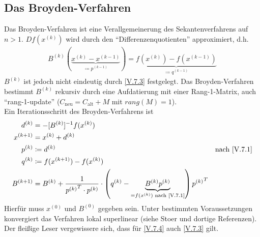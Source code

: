 \documentclass[ngerman,fontsize=11pt, paper=a4, parskip=half, titlepage=true, toc=bib]{scrbook}
\begin{document}
  
  
  \subsection{Das Broyden-Verfahren}
  Das Broyden-Verfahren ist eine Verallgemeinerung des Sekantenverfahrens
  auf $n>1$. $Df(x^{(k)})$ wird durch den
  \enquote{Differenzenquotienten} approximiert, d.h.
  \begin{gather}
    B^{(k)}(\underbrace{x^{(k)}-x^{(k-1)}}_{\coloneqq p^{(k-1)}})
    = \underbrace{f(x^{(k)})-f(x^{(k-1)})}_{\coloneqq
      q^{(k-1)}}
    \label{V.7.3}
  \end{gather}
  $B^{(k)}$ ist jedoch nicht eindeutig durch \eqref{V.7.3} festgelegt.
  Das Broyden-Verfahren bestimmt $B^{(k)}$ rekursiv durch eine 
  Aufdatierung mit einer Rang-1-Matrix, auch \enquote{rang-1-update}
  ($C_\text{neu} = C_\text{alt} +M$ mit $rang(M)=1$). \\

  Ein Iterationsschritt des Broyden-Verfahrens ist 
  \begin{align}\nonumber
    d^{(k)} &= -[B^{(k)}]^{-1} f(x^{(k)}) \\\nonumber
    x^{(k+1)} &= x^{(k)} + d^{(k)} \\\nonumber
    p^{(k)} & \coloneqq d^{(k)} &\text{nach
                                  \eqref{V.7.1}}\\\nonumber
    q^{(k)} & \coloneqq f(x^{(k+1)})-f(x^{(k)}) \\
    B^{(k+1)} & = B^{(k)} + \frac{1}{{p^{(k)}}^T\cdot p^{(k)}}
                \cdot \left(q^{(k)}-
                \underbrace{B^{(k)}p^{(k)}}_{=f(x^{(k)})
                \text{ nach \eqref{V.7.1}}}
                \right){p^{(k)}}^T
                \label{V.7.4}
  \end{align}
  Hierfür muss $x^{(0)} $ und $B^{(0)}$ gegeben sein.
  Unter bestimmten Voraussetzungen konvergiert das Verfahren lokal
  superlinear (siehe Stoer\cite{stoerbulirsch} und dortige Referenzen).
  Der fleißige Leser vergewissere sich, dass für
  \eqref{V.7.4} auch \eqref{V.7.3} gilt.
\end{document}
